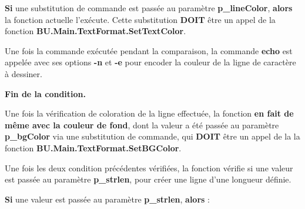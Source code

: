 \documentclass[a4paper,10pt]{article}
\begin{document}
    \begin{justify}
        \textbf{\color{cond}Si} une substitution de commande est passée au paramètre \textbf{\color{vars}p\_lineColor}, \textbf{\color{cond}alors} la fonction actuelle l'exécute. Cette substitution \textbf{DOIT} être un appel de la fonction \textbf{\color{func}BU.Main.TextFormat.SetTextColor}.
    \end{justify}

    \begin{justify}
        Une fois la commande exécutée pendant la comparaison, la commande \textbf{\color{cmds}echo} est appelée avec ses options \textbf{\color{cmds}-n} et \textbf{\color{cmds}-e} pour encoder la couleur de la ligne de caractère à dessiner.
    \end{justify}

    \begin{justify}
        \textbf{\color{cond}Fin de la condition.}
    \end{justify}

    \setlength{\parskip}{2em}


    \begin{justify}
        Une fois la vérification de coloration de la ligne effectuée, la fonction \textbf{\color{cond}en fait de même avec la couleur de fond}, dont la valeur a été passée au paramètre \textbf{\color{vars}p\_bgColor} via une substitution de commande, qui \textbf{DOIT} être un appel de la la fonction \textbf{\color{func}BU.Main.TextFormat.SetBGColor}.
    \end{justify}\setlength{\parskip}{1em}

    \begin{justify}
        Une fois les deux condition précédentes vérifiées, la fonction vérifie si une valeur est passée au paramètre \textbf{\color{vars}p\_strlen}, pour créer une ligne d'une longueur définie.
    \end{justify}

    \setlength{\parskip}{2em}


    \begin{justify}
        \textbf{\color{cond}Si} une valeur est passée au paramètre \textbf{\color{vars}p\_strlen}, \textbf{\color{cond}alors} :\par
    \end{justify}\setlength{\parskip}{1em}
\end{document}
